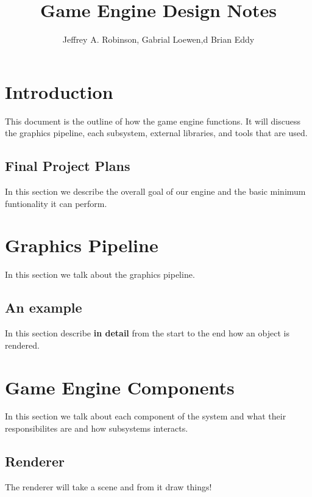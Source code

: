 \documentclass{article}
\title{Game Engine Design Notes}
\author{Jeffrey A. Robinson, Gabrial Loewen,d Brian Eddy}
\begin{document}
\maketitle

\section{Introduction}

This document is the outline of how the game engine functions.  It will discuess the graphics pipeline, each subsystem, external libraries, and tools that are used.

\subsection{Final Project Plans}

In this section we describe the overall goal of our engine and the basic minimum funtionality it can perform.

\section{Graphics Pipeline}

In this section we talk about the graphics pipeline.

\subsection{An example}

In this section describe {\bf in detail} from the start to the end how an object is rendered.

\section{Game Engine Components}

In this section we talk about each component of the system and what their responsibilites are and how subsystems interacts.

\subsection{Renderer}

The renderer will take a scene and from it draw things!
\end{document}
